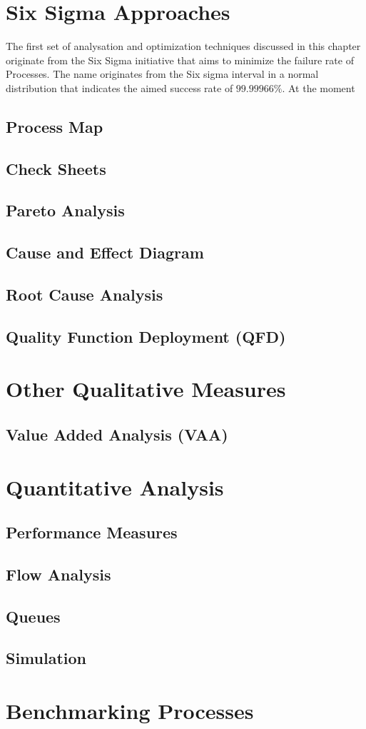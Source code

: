 \section{Six Sigma Approaches}
The first set of analysation and optimization techniques discussed in this chapter originate from the Six Sigma initiative that aims to minimize the failure rate of Processes. The name originates from the Six sigma interval in a normal distribution that indicates the aimed success rate of $99.99966\%$. At the moment 
\subsection{Process Map}
\subsection{Check Sheets}
\subsection{Pareto Analysis}
\subsection{Cause and Effect Diagram}
\subsection{Root Cause Analysis}
\subsection{Quality Function Deployment (QFD)}

\section{Other Qualitative Measures}

\subsection{Value Added Analysis (VAA)}

\section{Quantitative Analysis}
\subsection{Performance Measures}
\subsection{Flow Analysis}
\subsection{Queues}
\subsection{Simulation}

\section{Benchmarking Processes}

